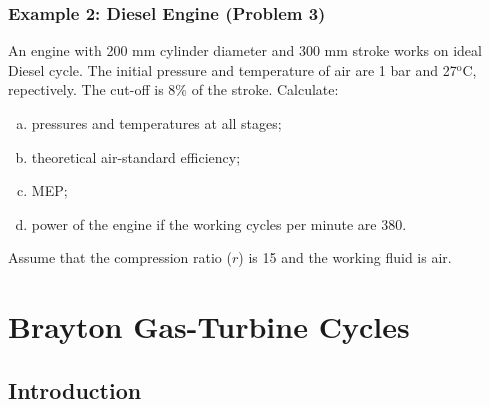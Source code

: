 \documentclass[10pt,compress]{beamer}
\begin{document}
\begin{frame}
 \frametitle{Example 2: Diesel Engine (Problem 3)}
     An engine with 200 mm cylinder diameter and 300 mm stroke works on ideal Diesel cycle. The initial pressure and temperature of air are 1 bar and 27$^{\text{o}}$C, repectively. The cut-off is 8$\%$ of the stroke. Calculate: 
       \begin{enumerate}[(a)]
         \item pressures and temperatures at all stages; 
         \item theoretical air-standard efficiency; 
         \item MEP; 
         \item power of the engine if the working cycles per minute are 380. 
       \end{enumerate}
 Assume that the compression ratio ($r$) is 15 and the working fluid is air.
\end{frame}



\section{Brayton Gas-Turbine Cycles}


\subsection{Introduction}
\end{document}
